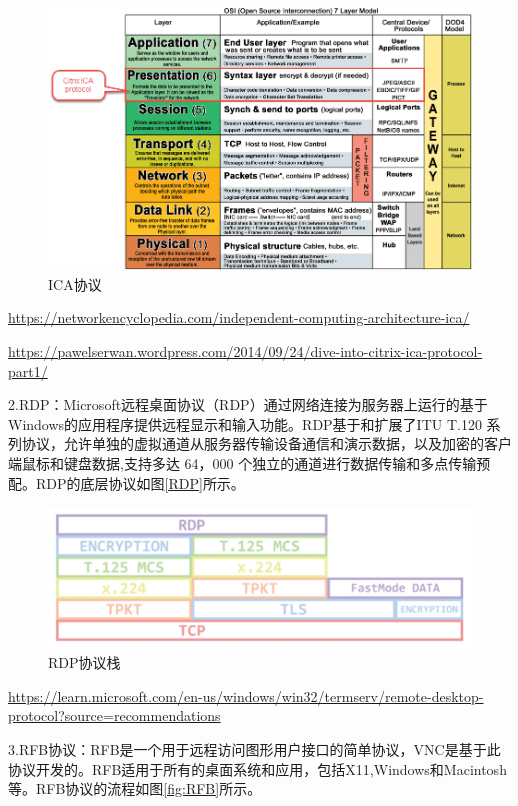 \documentclass[a4paper,twoside]{scrbook}
\begin{document}
\begin{CJK}{UTF8}{gbsn}
\begin{figure}[!htbp]
\centering
\includegraphics[width=1\textwidth]{Figures/ICA.png}
\caption{ICA协议}
\label{fig:ICA}
\end{figure}

\url{https://networkencyclopedia.com/independent-computing-architecture-ica/}

\url{https://pawelserwan.wordpress.com/2014/09/24/dive-into-citrix-ica-protocol-part1/}

2.RDP：Microsoft远程桌面协议（RDP）通过网络连接为服务器上运行的基于Windows的应用程序提供远程显示和输入功能。RDP基于和扩展了ITU T.120 系列协议，允许单独的虚拟通道从服务器传输设备通信和演示数据，以及加密的客户端鼠标和键盘数据,支持多达 64，000 个独立的通道进行数据传输和多点传输预配。RDP的底层协议如图\ref{RDP}所示。
\begin{figure}[!htbp]
\centering
\includegraphics[width=1\textwidth]{Figures/RDP.png}
\caption{RDP协议栈}
\label{fig:RDP}
\end{figure}

\url{https://learn.microsoft.com/en-us/windows/win32/termserv/remote-desktop-protocol?source=recommendations}

3.RFB协议：RFB是一个用于远程访问图形用户接口的简单协议，VNC是基于此协议开发的。RFB适用于所有的桌面系统和应用，包括X11,Windows和Macintosh等。RFB协议的流程如图\ref{fig:RFB}所示。


\end{CJK}
\end{document}
